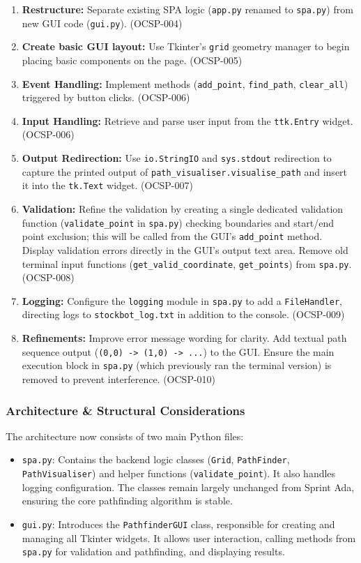 \begin{enumerate}
	\item \textbf{Restructure:} Separate existing SPA logic (\verb|app.py| renamed to \verb|spa.py|) from new GUI code (\verb|gui.py|). (OCSP-004)
	\item \textbf{Create basic GUI layout:} Use Tkinter's \verb|grid| geometry manager to begin placing basic components on the page. (OCSP-005)
	\item \textbf{Event Handling:} Implement methods (\verb|add_point|, \verb|find_path|, \verb|clear_all|) triggered by button clicks. (OCSP-006)
	\item \textbf{Input Handling:} Retrieve and parse user input from the \verb|ttk.Entry| widget. (OCSP-006)
	\item \textbf{Output Redirection:} Use \verb|io.StringIO| and \verb|sys.stdout| redirection to capture the printed output of \verb|path_visualiser.visualise_path| and insert it into the \verb|tk.Text| widget. (OCSP-007)
	\item \textbf{Validation:} Refine the validation by creating a single dedicated validation function (\verb|validate_point| in \verb|spa.py|) checking boundaries and start/end point exclusion; this will be called from the GUI's \verb|add_point| method. Display validation errors directly in the GUI's output text area. Remove old terminal input functions (\verb|get_valid_coordinate|, \verb|get_points|) from \verb|spa.py|. (OCSP-008)
	\item \textbf{Logging:} Configure the \verb|logging| module in \verb|spa.py| to add a \verb|FileHandler|, directing logs to \verb|stockbot_log.txt| in addition to the console. (OCSP-009)
	\item \textbf{Refinements:} Improve error message wording for clarity. Add textual path sequence output (\verb|(0,0) -> (1,0) -> ...|) to the GUI. Ensure the main execution block in \verb|spa.py| (which previously ran the terminal version) is removed to prevent interference. (OCSP-010)
\end{enumerate}

\subsubsection{Architecture \& Structural Considerations}

The architecture now consists of two main Python files:
\begin{itemize}
	\item \verb|spa.py|: Contains the backend logic classes (\verb|Grid|, \verb|PathFinder|, \verb|PathVisualiser|) and helper functions (\verb|validate_point|). It also handles logging configuration. The classes remain largely unchanged from Sprint Ada, ensuring the core pathfinding algorithm is stable.
	\item \verb|gui.py|: Introduces the \verb|PathfinderGUI| class, responsible for creating and managing all Tkinter widgets. It allows user interaction, calling methods from \verb|spa.py| for validation and pathfinding, and displaying results.
\end{itemize}

